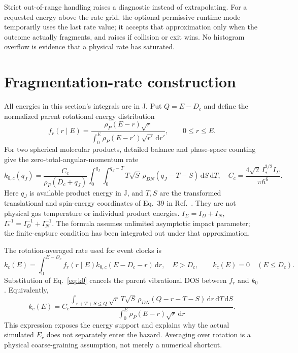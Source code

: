 \documentclass[10pt,a4paper]{article}
\newcommand{\dd}{\,\mathrm d}
\begin{document}
Strict out-of-range handling raises a diagnostic instead of extrapolating.
For a requested energy above the rate grid, the optional permissive runtime
mode temporarily uses the last rate value; it accepts that approximation only
when the outcome actually fragments, and raises if collision or exit wins.
No histogram overflow is evidence that a physical rate has saturated.

\clearpage
\section{Fragmentation-rate construction}\label{app:rates}
All energies in this section's integrals are in J. Put $Q=E-D_c$ and define
the normalized parent rotational energy distribution
\begin{equation}
 f_r(r\mid E)=\frac{\rho_P(E-r)\sqrt r}
 {\int_0^E\rho_P(E-r')\sqrt{r'}\dd r'},\qquad0\leq r\leq E.
 \label{eq:fr}
\end{equation}
For two spherical molecular products, detailed balance and phase-space
counting give the zero-total-angular-momentum rate~\cite{zapadinsky}
\begin{equation}
 k_{0,c}(q_J)=\frac{C_c}{\rho_P(D_c+q_J)}
 \int_0^{q_J}\!\int_0^{q_J-T}
 T\sqrt S\,\rho_{DN}(q_J-T-S)\dd S\dd T,
 \quad C_c=\frac{4\sqrt2\,I_*^{3/2}I_\Sigma}{\pi\hbar^6}.
 \label{eq:k0}
\end{equation}
Here $q_J$ is available product energy in J, and $T,S$ are the transformed
translational and spin-energy coordinates of Eq.~39 in Ref.~\cite{zapadinsky}.
They are not physical gas temperature or individual product energies.
$I_\Sigma=I_D+I_N$, $I_*^{-1}=I_D^{-1}+I_N^{-1}$.
The formula assumes unlimited asymptotic impact parameter; the finite-capture
condition has been integrated out under that approximation.

The rotation-averaged rate used for event clocks is
\begin{equation}
 k_c(E)=\int_0^{E-D_c} f_r(r\mid E)k_{0,c}(E-D_c-r)\dd r,
 \quad E>D_c,\qquad k_c(E)=0\quad(E\leq D_c).
 \label{eq:kavg}
\end{equation}
Substitution of Eq.~\eqref{eq:k0} cancels the parent vibrational DOS between
$f_r$ and $k_0$. Equivalently,
\[
 k_c(E)=C_c\frac{\displaystyle
 \int_{r+T+S\leq Q}\sqrt r\,T\sqrt S\,
 \rho_{DN}(Q-r-T-S)\dd r\dd T\dd S}
 {\displaystyle\int_0^E\rho_P(E-r)\sqrt r\dd r}.
\]
This expression exposes the energy support and explains why the actual
simulated $E_r$ does not separately enter the hazard. Averaging over rotation
is a physical coarse-graining assumption, not merely a numerical shortcut.
\end{document}
